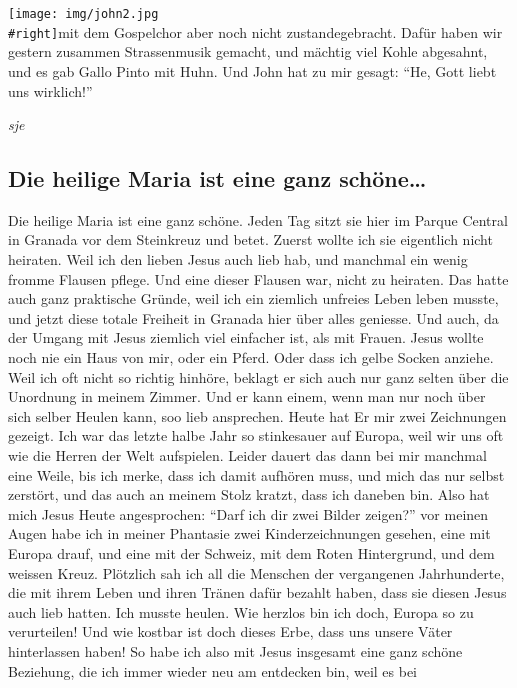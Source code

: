 \documentclass[
]{article}
\begin{document}
\texttt{[image: img/john2.jpg\\\#right]}mit dem Gospelchor aber noch nicht
zustandegebracht. Dafür haben wir gestern zusammen Strassenmusik
gemacht, und mächtig viel Kohle abgesahnt, und es gab Gallo Pinto mit
Huhn. Und John hat zu mir gesagt: ``He, Gott liebt uns wirklich!''

\emph{sje}

\hypertarget{die-heilige-maria-ist-eine-ganz-schuxf6ne}{%
\subsection{Die heilige Maria ist eine ganz
schöne\ldots{}}\label{die-heilige-maria-ist-eine-ganz-schuxf6ne}}

Die heilige Maria ist eine ganz schöne. Jeden Tag sitzt sie hier im
Parque Central in Granada vor dem Steinkreuz und betet. Zuerst wollte
ich sie eigentlich nicht heiraten. Weil ich den lieben Jesus auch lieb
hab, und manchmal ein wenig fromme Flausen pflege. Und eine dieser
Flausen war, nicht zu heiraten. Das hatte auch ganz praktische Gründe,
weil ich ein ziemlich unfreies Leben leben musste, und jetzt diese
totale Freiheit in Granada hier über alles geniesse. Und auch, da der
Umgang mit Jesus ziemlich viel einfacher ist, als mit Frauen. Jesus
wollte noch nie ein Haus von mir, oder ein Pferd. Oder dass ich gelbe
Socken anziehe. Weil ich oft nicht so richtig hinhöre, beklagt er sich
auch nur ganz selten über die Unordnung in meinem Zimmer. Und er kann
einem, wenn man nur noch über sich selber Heulen kann, soo lieb
ansprechen. Heute hat Er mir zwei Zeichnungen gezeigt. Ich war das
letzte halbe Jahr so stinkesauer auf Europa, weil wir uns oft wie die
Herren der Welt aufspielen. Leider dauert das dann bei mir manchmal eine
Weile, bis ich merke, dass ich damit aufhören muss, und mich das nur
selbst zerstört, und das auch an meinem Stolz kratzt, dass ich daneben
bin. Also hat mich Jesus Heute angesprochen: ``Darf ich dir zwei Bilder
zeigen?'' vor meinen Augen habe ich in meiner Phantasie zwei
Kinderzeichnungen gesehen, eine mit Europa drauf, und eine mit der
Schweiz, mit dem Roten Hintergrund, und dem weissen Kreuz. Plötzlich sah
ich all die Menschen der vergangenen Jahrhunderte, die mit ihrem Leben
und ihren Tränen dafür bezahlt haben, dass sie diesen Jesus auch lieb
hatten. Ich musste heulen. Wie herzlos bin ich doch, Europa so zu
verurteilen! Und wie kostbar ist doch dieses Erbe, dass uns unsere Väter
hinterlassen haben! So habe ich also mit Jesus insgesamt eine ganz
schöne Beziehung, die ich immer wieder neu am entdecken bin, weil es bei
\end{document}
